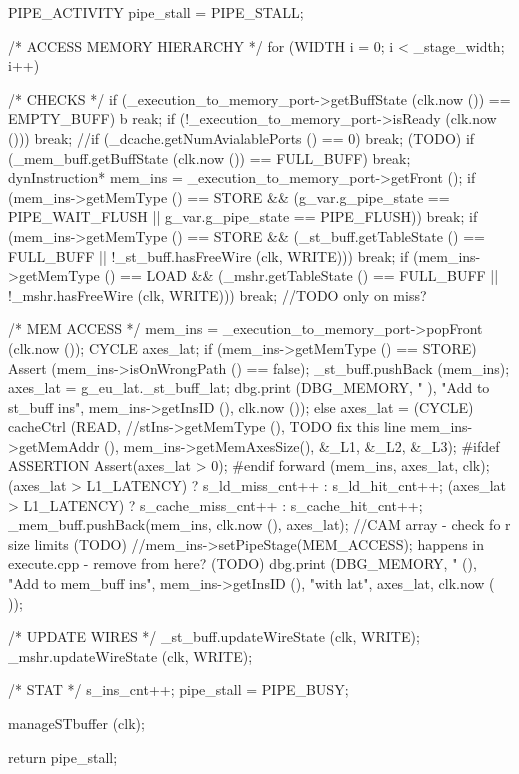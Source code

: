 \begin{DoxyCode}
                                               {
    PIPE_ACTIVITY pipe_stall = PIPE_STALL;

    /* ACCESS MEMORY HIERARCHY */
    for (WIDTH i = 0; i < _stage_width; i++) {
        /* CHECKS */
        if (_execution_to_memory_port->getBuffState (clk.now ()) == EMPTY_BUFF) b
      reak;
        if (!_execution_to_memory_port->isReady (clk.now ())) break;
        //if (_dcache.getNumAvialablePorts () == 0) break; (TODO)
        if (_mem_buff.getBuffState (clk.now ()) == FULL_BUFF) break;
        dynInstruction* mem_ins = _execution_to_memory_port->getFront ();
        if (mem_ins->getMemType () == STORE && 
           (g_var.g_pipe_state == PIPE_WAIT_FLUSH || g_var.g_pipe_state == 
      PIPE_FLUSH)) break;
        if (mem_ins->getMemType () == STORE && 
           (_st_buff.getTableState () == FULL_BUFF || !_st_buff.hasFreeWire (clk,
       WRITE))) break;
        if (mem_ins->getMemType () == LOAD &&
           (_mshr.getTableState () == FULL_BUFF || !_mshr.hasFreeWire (clk, 
      WRITE))) break; //TODO only on miss?

        /* MEM ACCESS */
        mem_ins = _execution_to_memory_port->popFront (clk.now ());
        CYCLE axes_lat;
        if (mem_ins->getMemType () == STORE) {
            Assert (mem_ins->isOnWrongPath () == false);
            _st_buff.pushBack (mem_ins);
            axes_lat = g_eu_lat._st_buff_lat;
            dbg.print (DBG_MEMORY, "%
      ), "Add to st_buff ins", mem_ins->getInsID (), clk.now ());
        } else {
            axes_lat = (CYCLE) cacheCtrl (READ,  //stIns->getMemType (), TODO fix
       this line
                                           mem_ins->getMemAddr (),
                                           mem_ins->getMemAxesSize(),
                                           &_L1, &_L2, &_L3);
#ifdef ASSERTION
            Assert(axes_lat > 0);
#endif
            forward (mem_ins, axes_lat, clk);
            (axes_lat > L1_LATENCY) ? s_ld_miss_cnt++ : s_ld_hit_cnt++;
            (axes_lat > L1_LATENCY) ? s_cache_miss_cnt++ : s_cache_hit_cnt++;
        }
        _mem_buff.pushBack(mem_ins, clk.now (), axes_lat); //CAM array - check fo
      r size limits (TODO)
        //mem_ins->setPipeStage(MEM_ACCESS); happens in execute.cpp - remove from
       here? (TODO)
        dbg.print (DBG_MEMORY, "%
       (), "Add to mem_buff ins", mem_ins->getInsID (), "with lat", axes_lat, clk.now (
      ));

        /* UPDATE WIRES */
        _st_buff.updateWireState (clk, WRITE);
        _mshr.updateWireState (clk, WRITE);

        /* STAT */
        s_ins_cnt++;
        pipe_stall = PIPE_BUSY;
    }

    manageSTbuffer (clk);

    return pipe_stall;
}
\end{DoxyCode}


